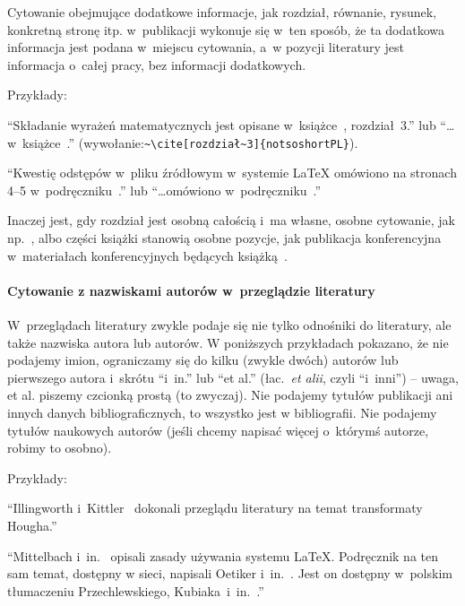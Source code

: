 Cytowanie obejmujące dodatkowe informacje, jak rozdział, równanie, rysunek, konkretną stronę itp. w~publikacji wykonuje się w~ten sposób, że ta dodatkowa informacja jest podana w~miejscu cytowania, a~w pozycji literatury jest informacja o~całej pracy, bez informacji dodatkowych. 

\noindent Przykłady:

``Składanie wyrażeń matematycznych jest opisane w~książce~, rozdział~3.'' lub ``\dots{}w~książce~\cite[rozdział~3]{notsoshortPL}.'' (wywołanie:\verb+~\cite[rozdział~3]{notsoshortPL}+).

``Kwestię odstępów w~pliku źródłowym w~systemie \LaTeX{} omówiono na stronach 4--5 w~podręczniku~.'' lub ``\dots{}omówiono w~podręczniku~\cite[str.~4--5]{notsoshortPL}.''

Inaczej jest, gdy rozdział jest osobną całością i~ma własne, osobne cytowanie, jak np.~, albo części książki stanowią osobne pozycje, jak publikacja konferencyjna~ w~materiałach konferencyjnych będących książką~.


\paragraph{Cytowanie z nazwiskami autorów w~przeglądzie literatury}
\label{sec:dod:cytowanie-nazwiska-przeglad}

W~przeglądach literatury zwykle podaje się nie tylko odnośniki do literatury, ale także nazwiska autora lub autorów. W poniższych przykładach pokazano, że nie podajemy imion, ograniczamy się do kilku (zwykle dwóch) autorów lub pierwszego autora i~skrótu ``i~in.'' lub ``et al.'' (łac.~{\em et alii}, czyli ``i~inni'') -- uwaga, et al. piszemy czcionką prostą (to zwyczaj). Nie podajemy tytułów publikacji ani innych danych bibliograficznych, to wszystko jest w bibliografii. Nie podajemy tytułów naukowych autorów (jeśli chcemy napisać więcej o~którymś autorze, robimy to osobno).

\noindent Przykłady: 

``Illingworth i~Kittler~ dokonali przeglądu literatury na temat transformaty Hougha.''

``Mittelbach i~in.~ opisali zasady używania systemu \LaTeX. Podręcznik na ten sam temat, dostępny w sieci, napisali Oetiker i~in.~. Jest on dostępny w~polskim tłumaczeniu Przechlewskiego, Kubiaka~i~in.~.''


